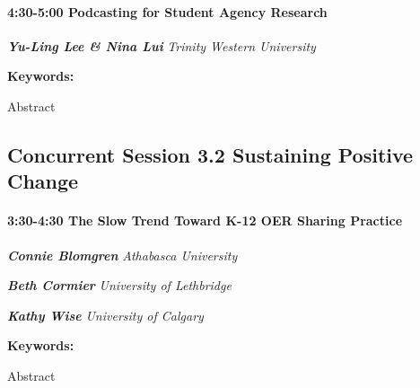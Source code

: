 \documentclass[
]{book}
\begin{document}
\begin{session}
\hypertarget{podcasting-for-student-agency-research}{%
\paragraph*{\texorpdfstring{4:30-5:00 \textbar{} \textbf{Podcasting for
Student Agency} \textbar{}
Research}{4:30-5:00 \textbar{} Podcasting for Student Agency \textbar{} Research}}\label{podcasting-for-student-agency-research}}

\textbf{\emph{Yu-Ling Lee \& Nina Lui}} \textbar{} \emph{Trinity Western
University}

\textbf{Keywords:}

Abstract
\end{session}

\hypertarget{concurrent-session-3.2-sustaining-positive-change}{%
\subsection*{Concurrent Session 3.2 \textbar{} Sustaining Positive Change}\label{concurrent-session-3.2-sustaining-positive-change}}

\begin{session}
\hypertarget{the-slow-trend-toward-k-12-oer-sharing-practice}{%
\paragraph*{\texorpdfstring{3:30-4:30 \textbar{} \textbf{The Slow Trend
Toward K-12 OER Sharing} \textbar{}
Practice}{3:30-4:30 \textbar{} The Slow Trend Toward K-12 OER Sharing \textbar{} Practice}}\label{the-slow-trend-toward-k-12-oer-sharing-practice}}

\textbf{\emph{Connie Blomgren}} \textbar{} \emph{Athabasca University}

\textbf{\emph{Beth Cormier}} \textbar{} \emph{University of Lethbridge}

\textbf{\emph{Kathy Wise}} \textbar{} \emph{University of Calgary}

\textbf{Keywords:}

Abstract
\end{session}
\end{document}
